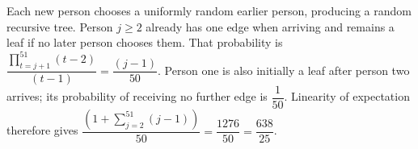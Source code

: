 Each new person chooses a uniformly random earlier person, producing a random recursive tree. Person $j\ge2$ already has one edge when arriving and remains a leaf if no later person chooses them. That probability is $\dfrac{\prod_{t=j+1}^{51}(t-2)}{(t-1)}=\dfrac{(j-1)}{50}$. Person one is also initially a leaf after person two arrives; its probability of receiving no further edge is $\dfrac{1}{50}$. Linearity of expectation therefore gives $\dfrac{(1+\sum_{j=2}^{51}(j-1))}{50}=\dfrac{1276}{50}=\boxed{\dfrac{638}{25}}$.
